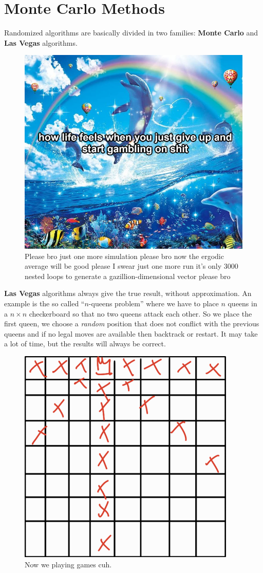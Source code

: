 \documentclass[12pt]{report}
\begin{document}
\section{Monte Carlo Methods}
Randomized algorithms are basically divided in two families: \textbf{\textcolor{OrangeRed2}{Monte Carlo}} and \textbf{\textcolor{Gold2}{Las Vegas}} algorithms.
\begin{figure}[H]
	\centering
	\includegraphics[width=0.5\linewidth]{img/screenshot064}
	\caption{Please bro just one more simulation please bro now the ergodic average will be good please I swear just one more run it's only 3000 nested loops to generate a gazillion-dimensional vector please bro}
	\label{fig:screenshot064}
\end{figure}
\textbf{\textcolor{Gold2}{Las Vegas}} algorithms always give the true result, without approximation. An example is the so called ``$n$-queens problem'' where we have to place $n$ queens in a $n\times n$ checkerboard so that no two queens attack each other. So we place the first queen, we choose a \textit{random} position that does not conflict with the previous queens and if no legal moves are available then backtrack or restart. It may take a lot of time, but the results will always be correct.
\begin{figure}[H]
	\centering
	\includegraphics[width=0.5\linewidth]{img/screenshot065}
	\caption{Now we playing games cuh.}
	\label{fig:screenshot065}
\end{figure}
\end{document}
